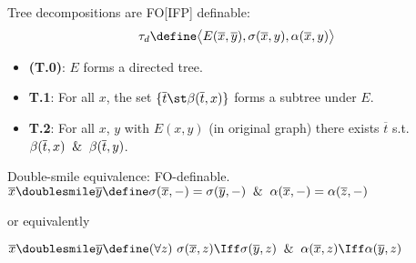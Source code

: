 \documentclass{beamer}
\begin{document}
\begin{frame}
  Tree decompositions are FO[IFP] definable:
  \begin{equation*}
    \tau_{d} \define \bigl\langle E(\overline{x}, \overline{y}),
    \sigma(\overline{x}, y), \alpha(\overline{x}, y) \bigr\rangle
  \end{equation*}
  \begin{itemize}
  \item \textbf{(T.0)}: $E$ forms a directed tree.
  \item \textbf{T.1}: For all $x$, the set $\{ \overline{t} \st
    \beta(\overline{t}, x)\}$ forms a subtree under $E$.
  \item \textbf{T.2}: For all $x$, $y$ with $E(x, y)$ (in original graph)
    there exists $\overline{t}$ s.t. $\beta(\overline{t}, x) \And
    \beta(\overline{t}, y)$.
  \end{itemize}
\end{frame}

\begin{frame}
  Double-smile equivalence: FO-definable.
  $\overline{x} \doublesmile \overline{y} \define \sigma(\overline{x}, -) =
  \sigma(\overline{y}, -) \And \alpha(\overline{x}, -) =
  \alpha(\overline{z}, -)$

  or equivalently

  $\overline{x} \doublesmile \overline{y} \define (\forall z)\  \sigma(\overline{x}, z) \Iff
  \sigma(\overline{y}, z) \And \alpha(\overline{x}, z) \Iff
  \alpha(\overline{y}, z)$  
\end{frame}
\end{document}
